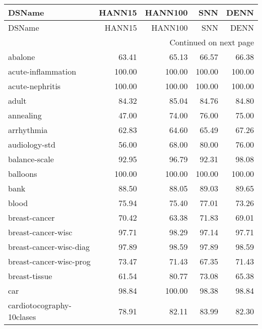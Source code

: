 \begin{longtable}{lrrrr}
\toprule
                        DSName &  HANN15 &  HANN100 &    SNN &   DENN \\
\midrule
\endfirsthead

\toprule
                        DSName &  HANN15 &  HANN100 &    SNN &   DENN \\
\midrule
\endhead
\midrule
\multicolumn{5}{r}{{Continued on next page}} \\
\midrule
\endfoot

\bottomrule
\endlastfoot
                       abalone &   63.41 &    65.13 &  66.57 &  66.38 \\
            acute-inflammation &  100.00 &   100.00 & 100.00 & 100.00 \\
               acute-nephritis &  100.00 &   100.00 & 100.00 & 100.00 \\
                         adult &   84.32 &    85.04 &  84.76 &  84.80 \\
                     annealing &   47.00 &    74.00 &  76.00 &  75.00 \\
                    arrhythmia &   62.83 &    64.60 &  65.49 &  67.26 \\
                 audiology-std &   56.00 &    68.00 &  80.00 &  76.00 \\
                 balance-scale &   92.95 &    96.79 &  92.31 &  98.08 \\
                      balloons &  100.00 &   100.00 & 100.00 & 100.00 \\
                          bank &   88.50 &    88.05 &  89.03 &  89.65 \\
                         blood &   75.94 &    75.40 &  77.01 &  73.26 \\
                 breast-cancer &   70.42 &    63.38 &  71.83 &  69.01 \\
            breast-cancer-wisc &   97.71 &    98.29 &  97.14 &  97.71 \\
       breast-cancer-wisc-diag &   97.89 &    98.59 &  97.89 &  98.59 \\
       breast-cancer-wisc-prog &   73.47 &    71.43 &  67.35 &  71.43 \\
                 breast-tissue &   61.54 &    80.77 &  73.08 &  65.38 \\
                           car &   98.84 &   100.00 &  98.38 &  98.84 \\
     cardiotocography-10clases &   78.91 &    82.11 &  83.99 &  82.30 \\

\end{longtable}

